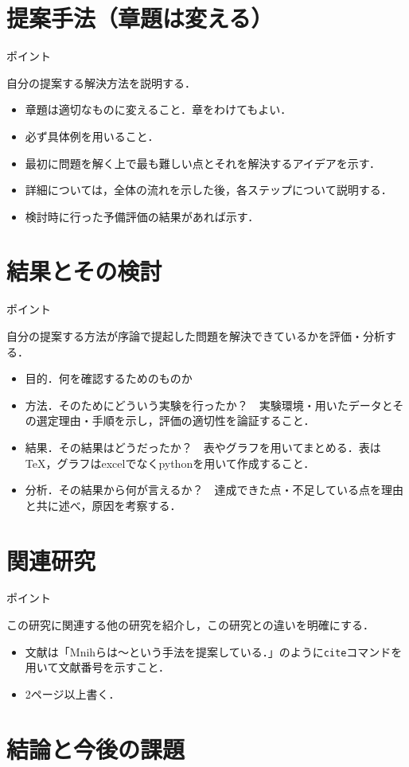 \documentclass[a4j,11pt,report]{jsbook}
\newcommand{\point}[1]{
\begin{itembox}[l]{ポイント}
#1
\end{itembox}
}
\begin{document}
\chapter{提案手法（章題は変える）\label{ch:method}}
\point{
自分の提案する解決方法を説明する．
\begin{itemize}
\item 章題は適切なものに変えること．章をわけてもよい．
\item 必ず具体例を用いること．
\item 最初に問題を解く上で最も難しい点とそれを解決するアイデアを示す．
\item 詳細については，全体の流れを示した後，各ステップについて説明する．
\item 検討時に行った予備評価の結果があれば示す．
\end{itemize}
}

\chapter{結果とその検討 \label{ch:result}}

\point{
自分の提案する方法が序論で提起した問題を解決できているかを評価・分析する．
\begin{itemize}
\item 目的．何を確認するためのものか
\item 方法．そのためにどういう実験を行ったか？　実験環境・用いたデータとその選定理由・手順を示し，評価の適切性を論証すること．
\item 結果．その結果はどうだったか？　表やグラフを用いてまとめる．表はTeX，グラフはexcelでなくpythonを用いて作成すること．
\item 分析．その結果から何が言えるか？　達成できた点・不足している点を理由と共に述べ，原因を考察する．
\end{itemize}
}

\chapter{関連研究\label{ch:relatedwork}}
\point{
この研究に関連する他の研究を紹介し，この研究との違いを明確にする．
\begin{itemize}
\item 文献は「Mnihらは～という手法を提案している\cite{Mnih15}．」のように\texttt{cite}コマンドを用いて文献番号を示すこと．
\item 2ページ以上書く．
\end{itemize}
}

\chapter{結論と今後の課題 \label{ch:conclusion}}
\end{document}
